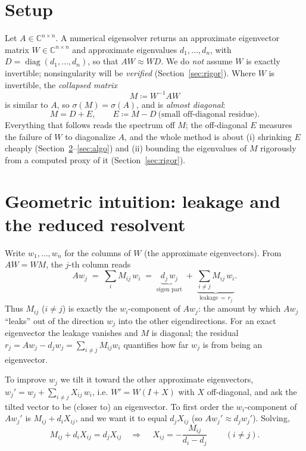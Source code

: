 \documentclass[11pt,a4paper]{article}
\newcommand{\C}{\mathbb{C}}
\newcommand{\spec}{\sigma}
\newcommand{\diag}{\operatorname{diag}}
\theoremstyle{plain}
\theoremstyle{definition}
\begin{document}
\section{Setup}\label{sec:setup}

Let $A\in\C^{n\times n}$. A numerical eigensolver returns an approximate
eigenvector matrix $W\in\C^{n\times n}$ and approximate eigenvalues $d_1,\dots,d_n$,
with $D=\diag(d_1,\dots,d_n)$, so that $AW\approx WD$. We do \emph{not} assume $W$
is exactly invertible; nonsingularity will be \emph{verified}
(Section~\ref{sec:rigor}). Where $W$ is invertible, the \emph{collapsed matrix}
\begin{equation}\label{eq:collapse}
  M \coloneqq W^{-1}AW
\end{equation}
is similar to $A$, so $\spec(M)=\spec(A)$, and is \emph{almost diagonal}:
\[
  M = D + E,\qquad E \coloneqq M-D \ \text{(small off-diagonal residue)}.
\]
Everything that follows reads the spectrum off $M$; the off-diagonal $E$ measures the
failure of $W$ to diagonalize $A$, and the whole method is about (i) shrinking $E$
cheaply (Section~\ref{sec:geom}--\ref{sec:algo}) and (ii) bounding the eigenvalues of
$M$ rigorously from a computed proxy of it (Section~\ref{sec:rigor}).

\section{Geometric intuition: leakage and the reduced resolvent}\label{sec:geom}

Write $w_1,\dots,w_n$ for the columns of $W$ (the approximate eigenvectors). From
$AW=WM$, the $j$-th column reads
\begin{equation}\label{eq:leakage}
  A w_j \;=\; \sum_{i} M_{ij}\, w_i \;=\; \underbrace{d_j\, w_j}_{\text{eigen part}}
            \;+\; \underbrace{\sum_{i\ne j} M_{ij}\, w_i}_{\text{leakage}\,=\,r_j}.
\end{equation}
Thus $M_{ij}$ ($i\ne j$) is exactly the $w_i$-component of $Aw_j$: the amount by which
$Aw_j$ ``leaks'' out of the direction $w_j$ into the other eigendirections. For an
exact eigenvector the leakage vanishes and $M$ is diagonal; the residual
$r_j = Aw_j-d_jw_j = \sum_{i\ne j}M_{ij}w_i$ quantifies how far $w_j$ is from being an
eigenvector.

To improve $w_j$ we tilt it toward the other approximate eigenvectors,
$w_j' = w_j + \sum_{i\ne j} X_{ij}\,w_i$, i.e. $W' = W(I+X)$ with $X$ off-diagonal,
and ask the tilted vector to be (closer to) an eigenvector. To first order the
$w_i$-component of $A w_j'$ is $M_{ij} + d_i X_{ij}$, and we want it to equal
$d_j X_{ij}$ (so $Aw_j'\approx d_j w_j'$). Solving,
\begin{equation}\label{eq:correction}
  M_{ij} + d_i X_{ij} = d_j X_{ij}
  \quad\Longrightarrow\quad
  \boxed{\,X_{ij} = -\frac{M_{ij}}{d_i-d_j}\,}\qquad(i\ne j).
\end{equation}
\end{document}
